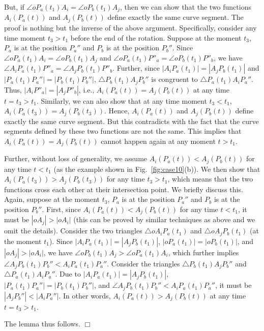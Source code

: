 \documentclass[11pt]{article}
\newenvironment{proof}{\noindent {\textbf{Proof:}}\rm}{\hfill $\Box$
\rm}
\begin{document}
\begin{proof}
\begin{itemize}
But, if $\angle oP_a(t_1)A_i=\angle oP_b(t_1)A_j$, then we can show that the
two functions $A_i(P_a(t))$ and $A_j(P_b(t))$ define exactly the
same curve segment. The proof is nothing but the inverse of the
above argument. Specifically, consider any time moment $t_3>t_1$
before the end of the rotation. Suppose at the moment $t_3$, $P_a$ is
at the position $P_a''$ and $P_b$ is at the position $P_b''$. Since
$\angle oP_a(t_1)A_i=\angle oP_b(t_1)A_j$ and $\angle oP_a(t_1)P''_a=\angle
oP_b(t_1)P''_b$, we have $\angle A_iP_a(t_1)P''_a=\angle A_jP_b(t_1)P''_b$. Further,
since $|A_iP_a(t_1)|=|A_jP_b(t_1)|$ and $|P_a(t_1)P_a''|=|P_b(t_1)P_b''|$, $\triangle
P_b(t_1)A_jP_b''$ is congruent to $\triangle P_a(t_1)A_iP_a''$. Thus,
$|A_iP''_a|=|A_jP''_b|$, i.e., $A_i(P_a(t))=A_j(P_b(t))$ at any time $t=t_3> t_1$.
Similarly, we can also show that at any time moment $t_3<t_1$,
$A_i(P_a(t_3))=A_j(P_b(t_3))$. Hence, $A_i(P_a(t))$ and
$A_j(P_b(t))$ define exactly the same curve segment. But this
contradicts with the fact that the curve segments defined by these two
functions are not the same. This implies that
$A_i(P_a(t))=A_j(P_b(t))$ cannot happen again at any moment $t>t_1$.

Further, without loss of generality, we assume
$A_i(P_a(t))<A_j(P_b(t))$ for any time $t<t_1$ (as
the example shown in Fig.~\ref{fig:case10}(b)). We then show that
$A_i(P_a(t_3))>A_j(P_b(t_3))$ for any time $t_3>t_1$, which means that
the two functions cross each other at their intersection point. We
briefly discuss this.  Again, suppose at the moment $t_3$, $P_a$ is
at the position $P_a''$ and $P_b$ is at the position $P_b''$. First,
since $A_i(P_a(t))<A_j(P_b(t))$ for any time $t<t_1$, it must be
$|oA_j|>|oA_i|$ (this can be proved by similar techniques as above and
we omit the details). Consider the two triangles $\triangle oA_iP_a(t_1)$ and
$\triangle oA_jP_b(t_1)$ (at the moment $t_1$). Since
$|A_iP_a(t_1)|=|A_jP_b(t_1)|$, $|oP_a(t_1)|=|oP_b(t_1)|$, and $|oA_j|>|oA_i|$, we have
$\angle oP_b(t_1)A_j>\angle oP_a(t_1)A_i$, which further implies $\angle
A_jP_b(t_1)P_b''<A_iP_a(t_1)P_a''$. Consider the triangles $\triangle
P_b(t_1)A_jP_b''$ and $\triangle P_a(t_1)A_iP_a''$. Due to $|A_iP_a(t_1)|=|A_jP_b(t_1)|$,
$|P_a(t_1)P_a''|=|P_b(t_1)P_b''|$, and $\angle A_jP_b(t_1)P_b''<A_iP_a(t_1)P_a''$,
it must be $|A_jP_b''|<|A_iP_a''|$. In
other words, $A_i(P_a(t))>A_j(P_b(t))$ at any time $t=t_3>t_1$.
\end{itemize}

The lemma thus follows.
\end{proof}
\end{document}
